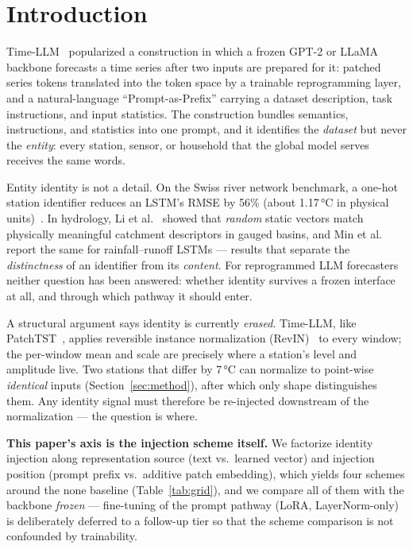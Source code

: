 \documentclass[sigconf,review]{acmart}
\begin{document}
\maketitle

\section{Introduction}
\label{sec:intro}

Time-LLM~\cite{jin2024timellm} popularized a construction in which a frozen GPT-2 or
LLaMA backbone forecasts a time series after two inputs are prepared for it: patched
series tokens translated into the token space by a trainable reprogramming layer, and
a natural-language ``Prompt-as-Prefix'' carrying a dataset description, task
instructions, and input statistics. The construction bundles semantics, instructions,
and statistics into one prompt, and it identifies the \emph{dataset} but never the
\emph{entity}: every station, sensor, or household that the global model serves
receives the same words.

Entity identity is not a detail. On the Swiss river network benchmark, a one-hot
station identifier reduces an LSTM's RMSE by 56\% (about 1.17\,°C in physical
units)~\cite{swissbench}. In hydrology, Li et al.~\cite{li2022random} showed that
\emph{random} static vectors match physically meaningful catchment descriptors in
gauged basins, and Min et al. report the same for rainfall--runoff LSTMs --- results
that separate the \emph{distinctness} of an identifier from its \emph{content}. For
reprogrammed LLM forecasters neither question has been answered: whether identity
survives a frozen interface at all, and through which pathway it should enter.

A structural argument says identity is currently \emph{erased}. Time-LLM, like
PatchTST~\cite{nie2023patchtst}, applies reversible instance normalization
(RevIN)~\cite{kim2022revin} to every window; the per-window mean and scale are
precisely where a station's level and amplitude live. Two stations that differ by
7\,°C can normalize to point-wise \emph{identical} inputs (Section~\ref{sec:method}),
after which only shape distinguishes them. Any identity signal must therefore be
re-injected downstream of the normalization --- the question is where.

\textbf{This paper's axis is the injection scheme itself.} We factorize identity
injection along representation source (text vs.\ learned vector) and injection
position (prompt prefix vs.\ additive patch embedding), which yields four schemes
around the \textsf{none} baseline (Table~\ref{tab:grid}), and we compare all of them
with the backbone \emph{frozen} --- fine-tuning of the prompt pathway (LoRA,
LayerNorm-only) is deliberately deferred to a follow-up tier so that the scheme
comparison is not confounded by trainability.
\end{document}
